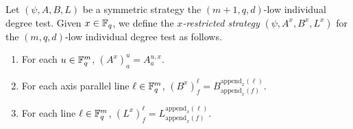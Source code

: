 \begin{definition}
Let $(\psi, A, B, L)$  be a symmetric strategy the $(m+1,q,d)$-low individual degree test.
Given $x \in \mathbb F_q$, we define the \emph{$x$-restricted strategy}
$(\psi, A^x, B^x, L^x)$ for the $(m,q,d)$-low individual degree test as follows.
\begin{enumerate}
\item For each $u \in \mathbb F_q^m$, $(A^x)^u_a = A^{u, x}_a$.
\item For each axis parallel line $\ell \in \mathbb F_q^m$, $(B^x)^\ell_f = B^{\mathrm{append}_x(\ell)}_{\mathrm{append}_x(f)}$.
\item For each  line $\ell \in \mathbb F_q^m$, $(L^x)^\ell_f = L^{\mathrm{append}_x(\ell)}_{\mathrm{append}_x(f)}$.
\end{enumerate}
\end{definition}

